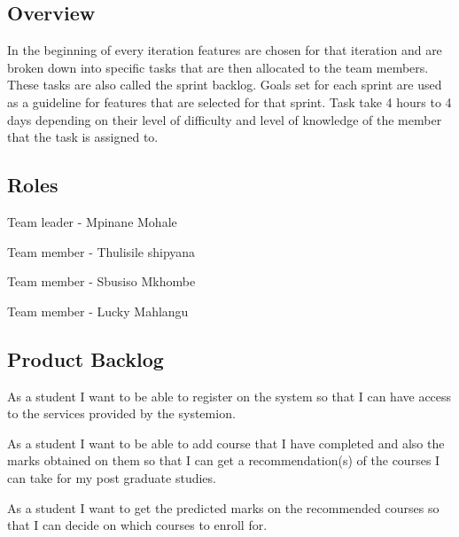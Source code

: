 \documentclass[10pt]{article}
\begin{document}
\subsection{Overview}

In the beginning of every iteration features are chosen for that iteration and are broken down into specific tasks that are then allocated to the team members. These tasks are also called the sprint backlog. Goals set for each sprint are used as a guideline for features that are selected for that sprint. Task take 4 hours to 4 days depending on their level of difficulty and level of knowledge of the member that the task is assigned to.

\subsection{Roles}

\begin{description}[font=$\bullet$~\normalfont\scshape\color{red!50!black}]

\item [] Team leader - Mpinane Mohale
\item [] Team member - Thulisile shipyana
\item [] Team member -  Sbusiso Mkhombe
\item [] Team member - Lucky Mahlangu
 
\end{description}

\subsection{Product Backlog}

\begin{description}[font=$\bullet$~\normalfont\scshape\color{red!50!black}]

\item [] As a student I want to be able to register on the system so that I can have access to the services provided by the systemion.
\item [] As a student I want to be able to add course that I have completed and also the marks obtained on them so that I can get a recommendation(s) of the courses I can take for my post graduate studies.
\item [] As a student I want to get the predicted marks on the recommended courses so that I can decide on which courses to enroll for.
\end{description}
\end{document}
